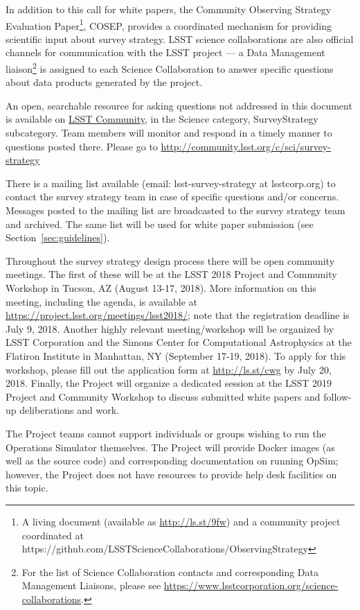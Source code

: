 \documentclass[DM,toc,usenatbib]{lsstdoc}
\begin{document}
In addition to this call for white papers, the Community Observing Strategy Evaluation Paper\footnote{A living document (available
as \url{http://ls.st/9fw}) and a community project coordinated at https://github.com/LSSTScienceCollaborations/ObservingStrategy}, COSEP, provides a coordinated mechanism for providing scientific input about survey strategy. LSST science collaborations are also official channels for communication with the LSST project --- a Data Management 
liaison\footnote{For the list of Science Collaboration contacts and corresponding Data Management Liaisons, please see \url{https://www.lsstcorporation.org/science-collaborations}.}  is assigned to each Science Collaboration to answer specific questions about data products generated by the project.

An open, searchable resource for asking questions not addressed in this document is available on \href{http://community.lsst.org}{LSST Community}, in the Science category, SurveyStrategy subcategory. Team members will monitor and respond in a timely manner to questions posted there. Please go to \url{http://community.lsst.org/c/sci/survey-strategy}

There is a mailing list available (email: lsst-survey-strategy at lsstcorp.org) to contact the survey strategy team in case of specific 
questions and/or concerns. Messages posted to the mailing list are broadcasted to the survey strategy team and archived. 
The same list will be used for white paper submission (see Section~\ref{sec:guidelines}). 

Throughout the survey strategy design process there will be open community meetings. The first of these will be 
at the LSST 2018 Project and Community Workshop in Tucson, AZ (August 13-17, 2018). More information on this 
meeting, including the agenda, is available at \url{https://project.lsst.org/meetings/lsst2018/}; note that the registration
deadline is July 9, 2018. Another highly relevant
meeting/workshop will be organized by LSST Corporation and the Simons Center for Computational Astrophysics
at the Flatiron Institute in Manhattan, NY (September 17-19, 2018). To apply for this workshop, please fill out the 
application form at \url{http://ls.st/cwg} by July 20, 2018. Finally, the Project will organize a dedicated session at the
LSST 2019 Project and Community Workshop to discuss submitted white papers and follow-up
deliberations and work. 

The Project teams cannot support individuals or groups wishing to run the Operations Simulator themselves. 
The Project will provide Docker images (as well as the source code) and corresponding documentation on running 
OpSim; however, the Project does not have resources to provide help desk facilities on this topic. 
\end{document}
